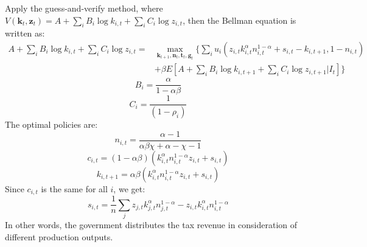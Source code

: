 \documentclass{article}
\begin{document}
Apply the guess-and-verify method, where \(V(\mathbf{k}_t, \mathbf{z}_t) = A + \sum_{i} B_i \log k_{i, t} + \sum_{i} C_i \log z_{i, t}\), then the Bellman equation is written as:
\begin{align*}
    A +  \sum_{i} B_i \log k_{i, t} + \sum_{i} C_i \log z_{i, t} = & \max_{\mathbf{k}_{t+1}, \mathbf{n}_{t}, \mathbf{t}_{t}, \mathbf{g}_{t}} \{ \sum_{i} u_{i}\left(z_{i,t} k_{i,t}^\alpha n_{i,t}^{1-\alpha} + s_{i, t} - k_{i, t+1}, 1 - n_{i,t}\right) \\
    & + \beta E[A + \sum_{i} B_i \log k_{i, t+1} + \sum_{i} C_i \log z_{i, t+1} | I_t] \}
\end{align*}
\begin{equation}
    B_i = \frac{\alpha}{1-\alpha\beta}
\end{equation}
\begin{equation}
    C_i = \frac{1}{(1-\rho_i)}
\end{equation}
The optimal policies are:
\begin{equation}
    n_{i,t} = \frac{{\alpha - 1}}{{\alpha \beta \chi + \alpha - \chi - 1}}
\end{equation}
\begin{equation}
    c_{i,t} = (1 -\alpha \beta) (k_{i,t}^\alpha n_{i,t}^{1 - \alpha} z_{i,t} + s_{i,t})
\end{equation}
\begin{equation}
    k_{i,t+1} = \alpha \beta (k_{i,t}^{\alpha} n_{i,t}^{1 - \alpha} z_{i,t} + s_{i,t})
\end{equation}
Since \(c_{i,t}\) is the same for all \(i\), we get:
\begin{equation}
    s_{i, t} = \frac{1}{n} \sum_{j} z_{j, t} k_{j,t}^\alpha n_{j,t}^{1-\alpha} - z_{i,t} k_{i,t}^\alpha n_{i,t}^{1 - \alpha} 
\end{equation}
In other words, the government distributes the tax revenue in consideration of different production outputs.



\end{document}
